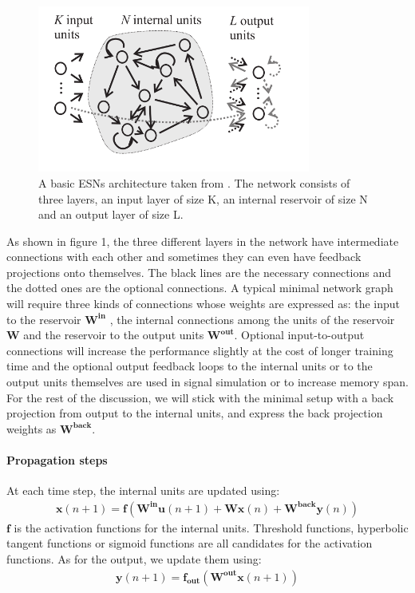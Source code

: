 \documentclass[a4paper,11pt,oneside]{article}
\begin{document}
\begin{figure}[h]
	\centering
	\includegraphics[width=0.8\textwidth]{img/esnG}
	\caption{A basic ESNs architecture taken from \cite{jaeger2001echo}. The network consists
	of three layers, an input layer of size K, an internal reservoir of size N and an output layer of size L.}
\end{figure}

As shown in figure 1, the three different layers in the network have intermediate connections with each other and sometimes they can even have feedback projections onto themselves. The black lines are the necessary connections and the dotted ones are the optional connections. A typical minimal network graph will require three kinds of connections whose weights are expressed as: the input to the reservoir $\mathbf{W^{in}}$ , the internal connections among the units of the reservoir $\mathbf{W}$ and the reservoir to the output units $\mathbf{W^{out}}$. Optional input-to-output connections will increase the performance slightly at the cost of longer training time \cite{davidverstraeten2009} and the optional output feedback loops to the internal units or to the output units themselves are used in signal simulation or to increase memory span\cite{maass2007computational}. For the rest of the discussion, we will stick with the minimal setup with a back projection from output to the internal units, and express the back projection weights as $\mathbf{W^{back}}$.

\paragraph{Propagation steps} At each time step, the internal units are updated using:
\begin{align}
\mathbf{x} (n + 1) = \mathbf{f}(\mathbf{W^{in}u}(n+1) + \mathbf{Wx}(n) + \mathbf{W^{back}y}(n) ) 
\end{align}
$\mathbf{f}$ is the activation functions for the internal units. Threshold functions, hyperbolic tangent functions or sigmoid functions are all candidates for the activation functions. As for the output, we update them using:
\begin{align}
\mathbf{y} (n + 1) = \mathbf{f_{out}}(\mathbf{W^{out}}\mathbf{x}(n+1) ) 
\end{align}
\end{document}
